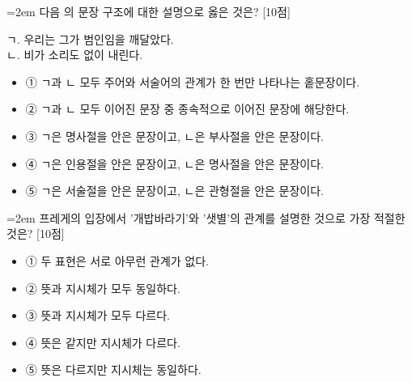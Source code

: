 \documentclass[10pt,a4paper]{article}
\newcommand{\qnum}[1]{%
  \tikz[baseline=(num.base)]{%
    \node[circle, fill=numCircle, text=white, inner sep=0pt,
          minimum size=18pt, font=\small\bfseries] (num) {#1};%
  }%
}
\newcommand{\pts}[1]{%
  \hfill\textcolor{ptsBadge}{[#1점]}%
}
\begin{document}
\vspace{4mm}
\begin{minipage}{\columnwidth}
{\hangindent=2em
\qnum{29}\enspace 다음 의 문장 구조에 대한 설명으로 옳은 것은? \pts{10}
\par}

\vspace{3mm}
\begin{tcolorbox}[bogi]
ㄱ. 우리는 그가 범인임을 깨달았다. \\{}
ㄴ. 비가 소리도 없이 내린다.
\end{tcolorbox}
\vspace{3mm}
\begin{itemize}[leftmargin=2.5em, labelsep=0.3em, label={}, itemsep=4pt, parsep=1pt, topsep=0pt]
  \item ① ㄱ과 ㄴ 모두 주어와 서술어의 관계가 한 번만 나타나는 홑문장이다.
  \item ② ㄱ과 ㄴ 모두 이어진 문장 중 종속적으로 이어진 문장에 해당한다.
  \item ③ ㄱ은 명사절을 안은 문장이고, ㄴ은 부사절을 안은 문장이다.
  \item ④ ㄱ은 인용절을 안은 문장이고, ㄴ은 명사절을 안은 문장이다.
  \item ⑤ ㄱ은 서술절을 안은 문장이고, ㄴ은 관형절을 안은 문장이다.
\end{itemize}
\end{minipage}
\vspace{4mm}

\vspace{4mm}
\begin{minipage}{\columnwidth}
{\hangindent=2em
\qnum{30}\enspace 프레게의 입장에서 '개밥바라기'와 '샛별'의 관계를 설명한 것으로 가장 적절한 것은? \pts{10}
\par}

\vspace{3mm}
\begin{itemize}[leftmargin=2.5em, labelsep=0.3em, label={}, itemsep=4pt, parsep=1pt, topsep=0pt]
  \item ① 두 표현은 서로 아무런 관계가 없다.
  \item ② 뜻과 지시체가 모두 동일하다.
  \item ③ 뜻과 지시체가 모두 다르다.
  \item ④ 뜻은 같지만 지시체가 다르다.
  \item ⑤ 뜻은 다르지만 지시체는 동일하다.
\end{itemize}
\end{minipage}
\vspace{4mm}
\end{document}
